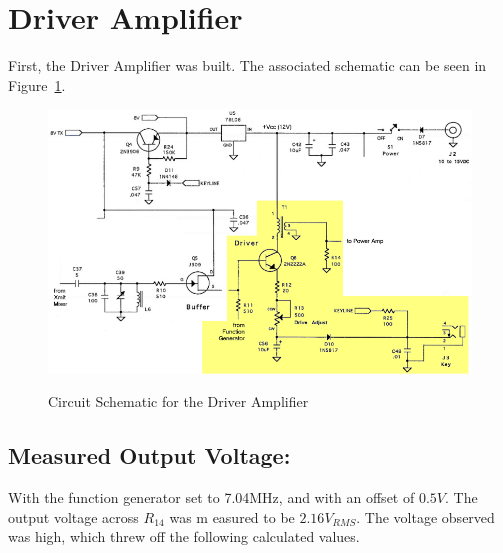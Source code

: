 \section{Driver Amplifier}

First, the Driver Amplifier was built. The associated schematic can be
seen in Figure~\ref{DriverAmp}.

\begin{figure}[h!]
  \centering
  \includegraphics[scale=0.6]{./img/DriverAmp.png}
  \label{DriverAmp}
  \caption{Circuit Schematic for the Driver Amplifier}
\end{figure}

\subsection{Measured Output Voltage: }
With the function generator set to 7.04MHz, and with an offset of 
$0.5V$. The output voltage across $R_{14}$ was m                      easured
to be $\boxed{2.16 V_{RMS}}$. The voltage observed was high, which threw
off the following calculated values.

